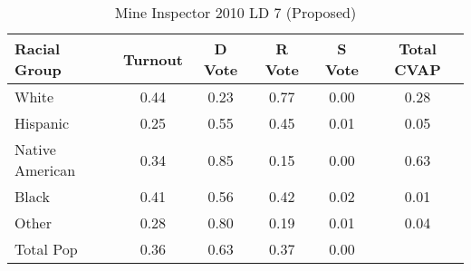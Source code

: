 \begin{table}[htb]
\begin{center}
\caption{Mine Inspector 2010 LD 7 (Proposed)}
\label{smine_cvap_ld_7}
\begin{tabular}{lccccc}
  \hline
Racial Group & Turnout & D Vote & R Vote & S Vote & Total CVAP \\ 
  \hline
White & 0.44 & 0.23 & 0.77 & 0.00 & 0.28 \\ 
  Hispanic & 0.25 & 0.55 & 0.45 & 0.01 & 0.05 \\ 
  Native American & 0.34 & 0.85 & 0.15 & 0.00 & 0.63 \\ 
  Black & 0.41 & 0.56 & 0.42 & 0.02 & 0.01 \\ 
  Other & 0.28 & 0.80 & 0.19 & 0.01 & 0.04 \\ 
  Total Pop & 0.36 & 0.63 & 0.37 & 0.00 &  \\ 
   \hline
\end{tabular}
\end{center}
\end{table}
